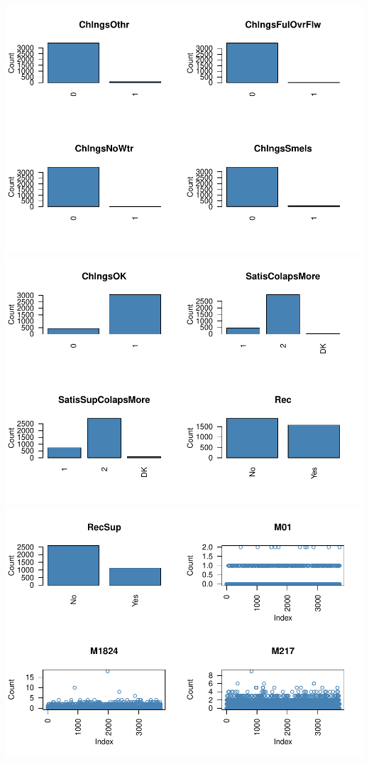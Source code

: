 \documentclass[11pt,]{article}
\begin{document}
\includegraphics{describe_FSMintentions_regional_seasonal_iDE-Camb_surveysOct2017_files/figure-latex/MCA_setup-7.pdf}
\includegraphics{describe_FSMintentions_regional_seasonal_iDE-Camb_surveysOct2017_files/figure-latex/MCA_setup-8.pdf}
\includegraphics{describe_FSMintentions_regional_seasonal_iDE-Camb_surveysOct2017_files/figure-latex/MCA_setup-9.pdf}
\end{document}
